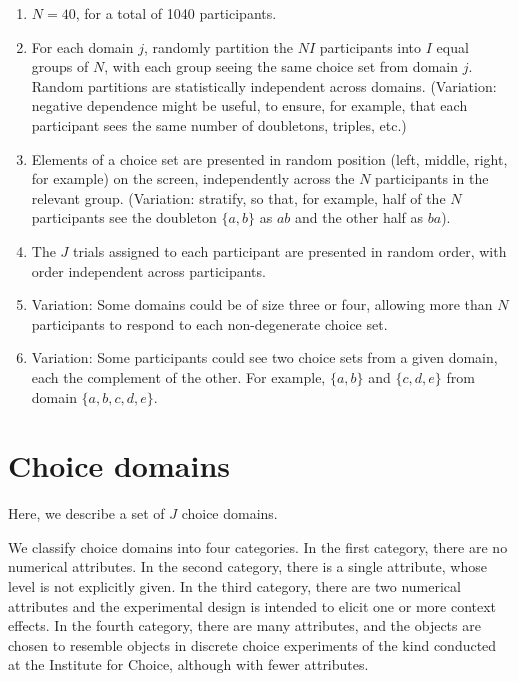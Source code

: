 \documentclass[11pt,letter]{amsart}
\begin{document}
\begin{enumerate}
\item $N=40$, for a total of 1040 participants. 

\item For each domain $j$, randomly partition the $NI$ participants into $I$
equal groups of $N$, with each group seeing the same choice set from domain $%
j$.  Random partitions are statistically independent across domains.
(Variation: negative dependence might be useful, to ensure, for example,
that each participant sees the same number of doubletons, triples, etc.)

\item Elements of a choice set are presented in random position (left,
middle, right, for example) on the screen, independently across the $N$
participants in the relevant group. (Variation: stratify, so that, for
example, half of the $N$ participants see the doubleton $\{a,b\}$ as $ab$
and the other half as $ba$).

\item The $J$ trials assigned to each participant are presented in random
order, with order independent across participants.

\item Variation: Some domains could be of size three or four, allowing more than $N$ participants to respond to each non-degenerate choice set.

\item Variation: Some participants could see two choice sets from a
given domain, each the complement of the other. For example, $\{a,b\}$ and $%
\{c,d,e\}$ from domain $\{a,b,c,d,e\}$.
\end{enumerate}

\section{Choice domains}

\label{s:domains}

Here, we describe a set of $J$ choice domains.

We classify choice domains into four categories. In the first category,
there are no numerical attributes. In the second category, there is a single
attribute, whose level is not explicitly given. In the third category, there
are two numerical attributes and the experimental design is intended to
elicit one or more context effects. In the fourth category, there are many
attributes, and the objects are chosen to resemble objects in discrete
choice experiments of the kind conducted at the Institute for Choice, although with fewer attributes.
\end{document}
